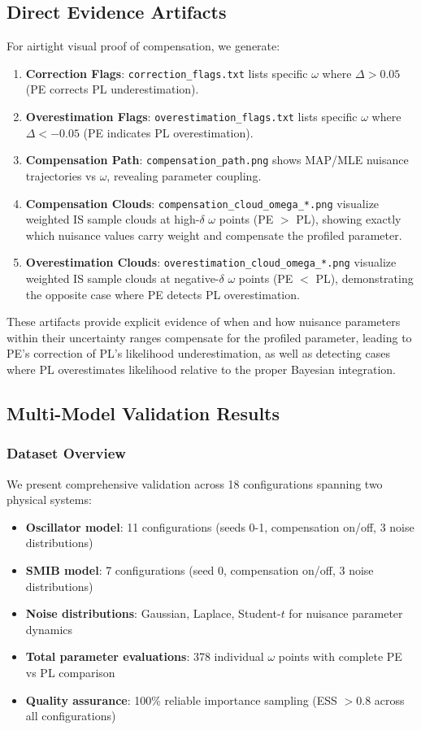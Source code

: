 \documentclass[conference]{IEEEtran}
\begin{document}
\subsection{Direct Evidence Artifacts}

For airtight visual proof of compensation, we generate:

\begin{enumerate}
\item \textbf{Correction Flags}: \texttt{correction\_flags.txt} lists specific $\omega$ where $\Delta > 0.05$ (PE corrects PL underestimation).
\item \textbf{Overestimation Flags}: \texttt{overestimation\_flags.txt} lists specific $\omega$ where $\Delta < -0.05$ (PE indicates PL overestimation).
\item \textbf{Compensation Path}: \texttt{compensation\_path.png} shows MAP/MLE nuisance trajectories vs $\omega$, revealing parameter coupling.
\item \textbf{Compensation Clouds}: \texttt{compensation\_cloud\_omega\_*.png} visualize weighted IS sample clouds at high-$\delta$ $\omega$ points (PE $>$ PL), showing exactly which nuisance values carry weight and compensate the profiled parameter.
\item \textbf{Overestimation Clouds}: \texttt{overestimation\_cloud\_omega\_*.png} visualize weighted IS sample clouds at negative-$\delta$ $\omega$ points (PE $<$ PL), demonstrating the opposite case where PE detects PL overestimation.
\end{enumerate}

These artifacts provide explicit evidence of when and how nuisance parameters within their uncertainty ranges compensate for the profiled parameter, leading to PE's correction of PL's likelihood underestimation, as well as detecting cases where PL overestimates likelihood relative to the proper Bayesian integration.

\subsection{Multi-Model Validation Results}

\subsubsection{Dataset Overview}
We present comprehensive validation across 18 configurations spanning two physical systems:
\begin{itemize}
\item \textbf{Oscillator model}: 11 configurations (seeds 0-1, compensation on/off, 3 noise distributions)
\item \textbf{SMIB model}: 7 configurations (seed 0, compensation on/off, 3 noise distributions)  
\item \textbf{Noise distributions}: Gaussian, Laplace, Student-$t$ for nuisance parameter dynamics
\item \textbf{Total parameter evaluations}: 378 individual $\omega$ points with complete PE vs PL comparison
\item \textbf{Quality assurance}: 100\% reliable importance sampling (ESS $> 0.8$ across all configurations)
\end{itemize}
\end{document}
